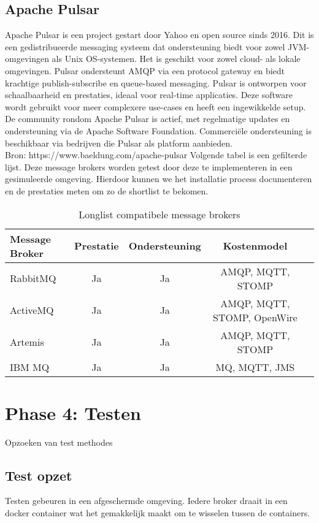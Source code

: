 \subsection{Apache Pulsar}
Apache Pulsar is een project gestart door Yahoo en open source sinds 2016.
Dit is een gedistribueerde messaging systeem dat ondersteuning biedt voor zowel JVM-omgevingen als Unix OS-systemen.
Het is geschikt voor zowel cloud- als lokale omgevingen. 
Pulsar ondersteunt AMQP via een protocol gateway en biedt krachtige publish-subscribe en queue-based messaging.
Pulsar is ontworpen voor schaalbaarheid en prestaties, ideaal voor real-time applicaties.
Deze software wordt gebruikt voor meer complexere use-cases en heeft een ingewikkelde setup.
De community rondom Apache Pulsar is actief, met regelmatige updates en ondersteuning via de Apache Software Foundation. 
Commerciële ondersteuning is beschikbaar via bedrijven die Pulsar als platform aanbieden.
\\
Bron: https://www.baeldung.com/apache-pulsar
\newpage
Volgende tabel is een gefilterde lijst.
Deze message brokers worden getest door deze te implementeren in een gesimuleerde omgeving.
Hierdoor kunnen we het installatie process documenteren en de prestaties meten om zo de shortlist te bekomen.

\begin{table}[h!]
  \footnotesize
  \centering
  \begin{tabular}{|l|c|c|c|c|}
  \hline
  Message Broker & Prestatie & Ondersteuning & Kostenmodel \\
  \hline
  RabbitMQ & Ja & Ja & AMQP, MQTT, STOMP \\
  \hline
  ActiveMQ & Ja & Ja & AMQP, MQTT, STOMP, OpenWire \\ 
  \hline
  Artemis & Ja & Ja & AMQP, MQTT, STOMP  \\
  \hline
  IBM MQ & Ja & Ja & MQ, MQTT, JMS  \\
  \hline
  \end{tabular}
  \caption{\label{tab:message_brokers_filtered}Longlist compatibele message brokers}
  \end{table}


\section{Phase 4: Testen}
  Opzoeken van test methodes 
  
  \subsection{Test opzet}
  Testen gebeuren in een afgeschermde omgeving.
  Iedere broker draait in een docker container wat het gemakkelijk maakt om te wisselen tussen de containers.
  
